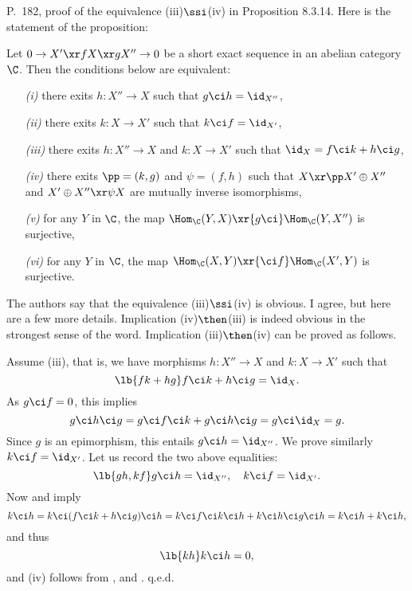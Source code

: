 \documentclass[12pt]{article}
\theoremstyle{remark}
\theoremstyle{definition}
\begin{document}

\begin{s} 
P.~182, proof of the equivalence (iii)$\ssi$(iv) in Proposition 8.3.14. Here is the statement of the proposition:

\begin{prop}[Proposition 8.3.14 p. 182] 
Let $0\to X'\xr fX\xr gX''\to0$ be a short exact sequence in an abelian category $\C$. Then the conditions below are equivalent:
\begin{itemize}
\item[\em(i)] there exits $h:X''\to X$ such that $g\ci h=\id_{X''}$,
\item[\em(ii)] there exits $k:X\to X'$ such that $k\ci f=\id_{X'}$,
\item[\em(iii)] there exits $h:X''\to X$ and $k:X\to X'$ such that $\id_X=f\ci k+h\ci g$,
\item[\em(iv)] there exits $\pp=(k,g)$ and $\psi=(f,h)$ such that $X\xr\pp X'\oplus X''$ and $X'\oplus X''\xr\psi X$ are mutually inverse isomorphisms,
\item[\em(v)] for any $Y$ in $\C$, the map $\Hom_\C(Y,X)\xr{g\ci}\Hom_\C(Y,X'')$ is surjective,
\item[\em(vi)] for any $Y$ in $\C$, the map $\Hom_\C(X,Y)\xr{\ci f}\Hom_\C(X',Y)$ is surjective.
\end{itemize}
\end{prop}

The authors say that the equivalence (iii)$\ssi$(iv) is obvious. I agree, but here are a few more details. Implication (iv)$\then$(iii) is indeed obvious in the strongest sense of the word. Implication (iii)$\then$(iv) can be proved as follows. 

Assume (iii), that is, we have morphisms $h:X''\to X$ and $k:X\to X'$ such that 
\begin{equation}\lb{fk+hg} 
f\ci k+h\ci g=\id_X.
\end{equation} 
As $g\ci f=0$, this implies 
$$
g\ci h\ci g=g\ci f\ci k+g\ci h\ci g=g\ci\id_X=g. 
$$ 
Since $g$ is an epimorphism, this entails $g\ci h=\id_{X''}$. We prove similarly $k\ci f=\id_{X'}$. Let us record the two above equalities: 
\begin{equation}\lb{gh,kf} 
g\ci h=\id_{X''},\quad k\ci f=\id_{X'}.
\end{equation} 
Now  and  imply 
$$
k\ci h=k\ci(f\ci k+h\ci g)\ci h=k\ci f\ci k\ci h+k\ci h\ci g\ci h=k\ci h+k\ci h,
$$ 
and thus 
\begin{equation}\lb{kh} 
k\ci h=0, 
\end{equation} 
and (iv) follows from ,  and . q.e.d.
\end{s}
\end{document}
